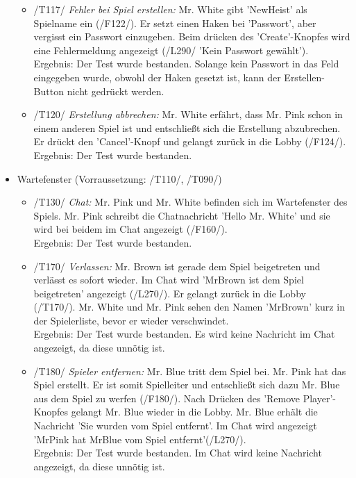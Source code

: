 \documentclass[a4paper]{article}
\begin{document}
\begin{itemize}
\begin{itemize}
		\item /T117/ \textit{Fehler bei Spiel erstellen:} Mr. White gibt 'NewHeist' als Spielname ein (/F122/). Er setzt einen 			Haken bei 'Passwort', aber vergisst ein Passwort einzugeben. Beim drücken des 'Create'-Knopfes wird eine 					Fehlermeldung angezeigt (/L290/ 'Kein Passwort gewählt'). \\
		Ergebnis: Der Test wurde bestanden. Solange kein Passwort in das Feld eingegeben wurde, obwohl der Haken 				gesetzt ist, kann der Erstellen-Button nicht gedrückt werden.
		
		\item /T120/ \textit{Erstellung abbrechen:} Mr. White erfährt, dass Mr. Pink schon in einem anderen Spiel ist und 				entschließt sich die Erstellung abzubrechen. Er drückt den 'Cancel'-Knopf und gelangt zurück in die Lobby		(/F124/). \\
		Ergebnis: Der Test wurde bestanden.
		
	\end{itemize}
	\item Wartefenster (Vorraussetzung: /T110/, /T090/)
	
	\begin{itemize}
		
		\item /T130/ \textit{Chat:} Mr. Pink und Mr. White befinden sich im Wartefenster des Spiels. Mr. Pink schreibt 			die Chatnachricht 'Hello Mr. White' und sie wird bei beidem im Chat angezeigt (/F160/). \\
		Ergebnis: Der Test wurde bestanden.
		
		\item /T170/ \textit{Verlassen:} Mr. Brown ist gerade dem Spiel beigetreten und verlässt es sofort wieder. Im Chat 			wird 'MrBrown ist dem Spiel beigetreten' angezeigt (/L270/). Er gelangt zurück in die Lobby (/T170/). Mr. White 			und Mr. Pink sehen den Namen 'MrBrown' kurz in der Spielerliste, bevor er wieder verschwindet. \\
		Ergebnis: Der Test wurde bestanden. Es wird keine Nachricht im Chat angezeigt, da diese unnötig ist.
		
		\item /T180/ \textit{Spieler entfernen:} Mr. Blue tritt dem Spiel bei. Mr. Pink hat das Spiel erstellt. Er ist somit 				Spielleiter und entschließt sich dazu Mr. Blue aus dem Spiel zu werfen (/F180/). Nach Drücken des 'Remove 				Player'-Knopfes gelangt Mr. Blue wieder in die Lobby. Mr. Blue erhält die Nachricht 'Sie wurden vom Spiel 				entfernt'. Im Chat wird angezeigt 'MrPink hat MrBlue vom Spiel entfernt'(/L270/). \\
		Ergebnis: Der Test wurde bestanden. Im Chat wird keine Nachricht angezeigt, da diese unnötig ist.
		

\end{itemize}
\end{itemize}
\end{document}
